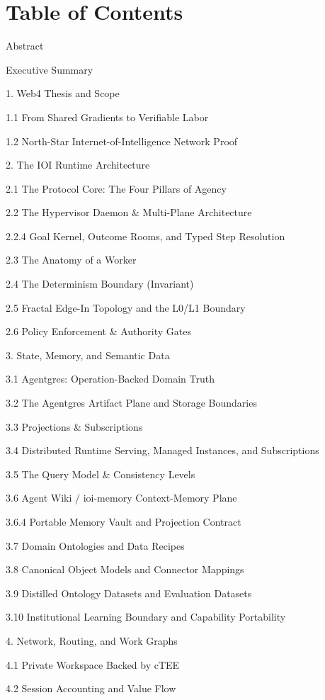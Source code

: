 \documentclass[
  11pt,
]{article}
\begin{document}
\hypertarget{table-of-contents}{%
\section{Table of Contents}\label{table-of-contents}}

Abstract

Executive Summary

1. Web4 Thesis and Scope

1.1 From Shared Gradients to Verifiable Labor

1.2 North-Star Internet-of-Intelligence Network Proof

2. The IOI Runtime Architecture

2.1 The Protocol Core: The Four Pillars of Agency

2.2 The Hypervisor Daemon \& Multi-Plane Architecture

2.2.4 Goal Kernel, Outcome Rooms, and Typed Step Resolution

2.3 The Anatomy of a Worker

2.4 The Determinism Boundary (Invariant)

2.5 Fractal Edge-In Topology and the L0/L1 Boundary

2.6 Policy Enforcement \& Authority Gates

3. State, Memory, and Semantic Data

3.1 Agentgres: Operation-Backed Domain Truth

3.2 The Agentgres Artifact Plane and Storage Boundaries

3.3 Projections \& Subscriptions

3.4 Distributed Runtime Serving, Managed Instances, and Subscriptions

3.5 The Query Model \& Consistency Levels

3.6 Agent Wiki / ioi-memory Context-Memory Plane

3.6.4 Portable Memory Vault and Projection Contract

3.7 Domain Ontologies and Data Recipes

3.8 Canonical Object Models and Connector Mappings

3.9 Distilled Ontology Datasets and Evaluation Datasets

3.10 Institutional Learning Boundary and Capability Portability

4. Network, Routing, and Work Graphs

4.1 Private Workspace Backed by cTEE

4.2 Session Accounting and Value Flow
\end{document}
